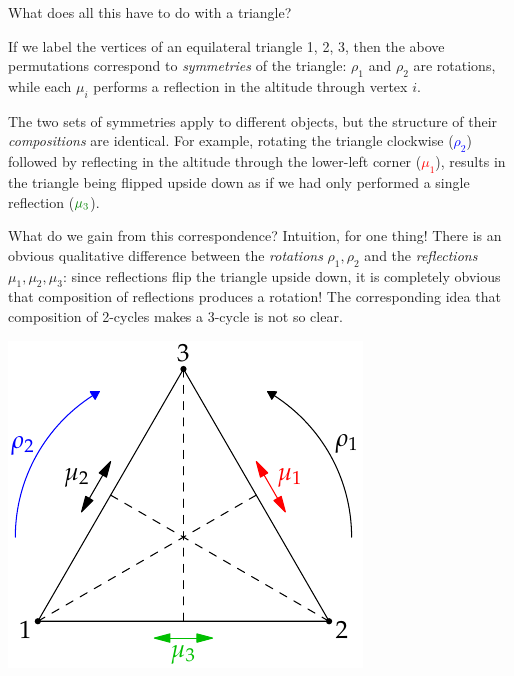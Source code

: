 \begin{tcolorbox}[exstyle]
	What does all this have to do with a triangle?\medbreak
	
	If we label the vertices of an equilateral triangle 1, 2, 3, then the above permutations correspond to \emph{symmetries} of the triangle: $\rho_1$ and $\rho_2$ are rotations, while each $\mu_i$ performs a reflection in the altitude through vertex $i$.\medbreak
	
	\begin{minipage}{0.64\textwidth}\vspace{0pt}
		The two sets of symmetries apply to different objects, but the structure of their \emph{compositions} are identical. For example, rotating the triangle clockwise (\textcolor{blue}{$\rho_2$}) followed by reflecting in the altitude through the lower-left corner (\textcolor{red}{$\mu_1$}), results in the triangle being flipped upside down as if we had only performed a single reflection ($\textcolor{Green}{\mu_3}$).\medbreak
		
		What do we gain from this correspondence? Intuition, for one thing! There is an obvious qualitative difference between the \emph{rotations} $\rho_1,\rho_2$ and the \emph{reflections} $\mu_1,\mu_2,\mu_3$: since reflections flip the triangle upside down, it is completely obvious that composition of reflections produces a rotation! The corresponding idea that composition of 2-cycles makes a 3-cycle is not so clear.
	\end{minipage}
	\hfill
	\begin{minipage}{0.35\textwidth}\vspace{-8pt}
		\flushright\includegraphics[scale=0.9]{intro-s3}
	\end{minipage}
	\medbreak
	

\end{tcolorbox}
